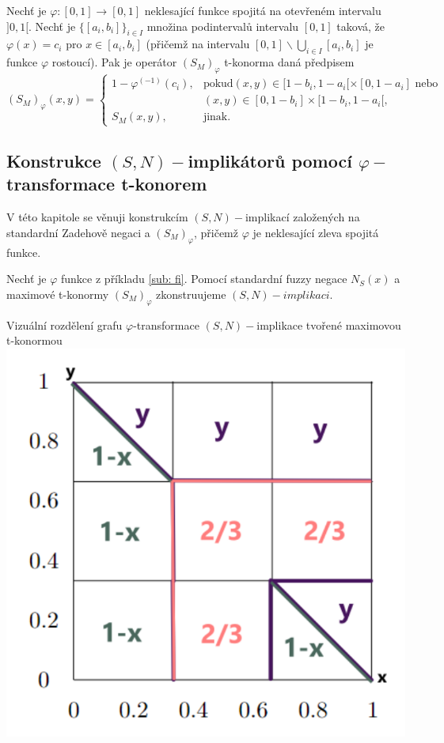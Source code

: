 \begin{sentence}
    
 Nech\v t je $\varphi:[0,1]\rightarrow [0,1]$
neklesající funkce spojitá na otevřeném intervalu $]0,1[$.
Nech\v t je $\{[a_i,b_i]\}_{i\in I}$ množina podinterval\r u
intervalu $[0,1]$ taková, že $\varphi(x)=c_i$ pro $x\in
[a_i,b_i]$ (přičemž na intervalu $[0,1]\backslash \bigcup \limits_{i \in I}
[a_i,b_i]$ je funkce $\varphi$
rostoucí).
Pak je operátor $(S_M)_{\varphi}$  t-konorma daná předpisem
$$ (S_M)_{\varphi}(x,y) = \begin{cases} 1-\varphi^{(-1)}(c_i), &\mbox {pokud
$(x,y)\in [1-b_i,1-a_i[\times[0,1-a_i]$ nebo}
\\ & (x,y)\in [0,1-b_i]\times[1-b_i,1-a_i[,
\\ S_M(x,y), &\mbox {jinak.}
\end{cases} $$
\end{sentence}



\subsection{Konstrukce $(S,N)-$implik\'ator\r u pomoc\'i $\varphi-$transformace t-konorem}
 V této kapitole se věnuji konstrukcím $(S,N)-$implikací založených na standardní Zadehově negaci a $(S_M)_\varphi$, přičemž $\varphi$ je neklesající zleva spojitá funkce.
 
\begin{example}
    Nech\v t je $\varphi$ funkce z p\v ríkladu \ref{sub: fi}.  Pomocí standardní fuzzy negace $N_S(x)$ a maximové t-konormy $(S_M)_\varphi$  zkonstruujeme $(S,N)-implikaci$. 
\end{example}
   
     \begin{graph} 
     Vizu\' aln\' i rozd\v elen\'i grafu $\varphi$-transformace $(S,N)-$implikace tvořené maximovou t-konormou\\
        \centering
        \includegraphics[scale=0.8]{template-fig/phi-impli.pdf}
    \end{graph}


